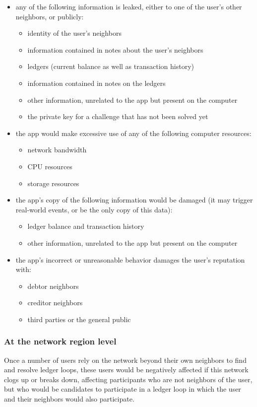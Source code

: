\documentclass[11pt,twoside,a4paper]{article}
\begin{document}
\begin{itemize}
\item any of the following information is leaked, either to one of the user's other neighbors, or publicly:
  \begin{itemize}
  \item identity of the user's neighbors
  \item information contained in notes about the user's neighbors
  \item ledgers (current balance as well as transaction history)
  \item information contained in notes on the ledgers
  \item other information, unrelated to the app but present on the computer
  \item the private key for a challenge that has not been solved yet
  \end{itemize}
  
\item the app would make excessive use of any of the following computer resources:
  \begin{itemize}
  \item network bandwidth
  \item CPU resources
  \item storage resources
  \end{itemize}
  
\item the app's copy of the following information would be damaged (it may trigger real-world events, or be the only copy of this data):
  \begin{itemize}
  \item ledger balance and transaction history
  \item other information, unrelated to the app but present on the computer
  \end{itemize}
  
\item the app's incorrect or unreasonable behavior damages the user's reputation with:
  \begin{itemize}
  \item debtor neighbors
  \item creditor neighbors
  \item third parties or the general public
  \end{itemize}
\end{itemize}

\subsubsection{At the network region level}
Once a number of users rely on the network beyond their own neighbors to find and resolve ledger loops, these users would be negatively
affected if this network clogs up or breaks down, affecting participants who are not neighbors of the user, but who would be candidates
to participate in a ledger loop in which the user and their neighbors would also participate.
\end{document}
